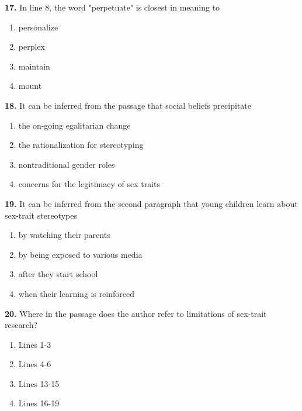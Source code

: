 \documentclass[12pt]{article}
\begin{document}
\par
\vspace{0.25\baselineskip}
\noindent\textbf{17.} In line 8, the word "perpetuate" is closest in meaning to
\begin{enumerate}[label=(\Alph*),leftmargin=*,itemsep=0.2em]
\item personalize
\item perplex
\item maintain
\item mount
\end{enumerate}
\par
\vspace{0.25\baselineskip}
\noindent\textbf{18.} It can be inferred from the passage that social beliefs precipitate
\begin{enumerate}[label=(\Alph*),leftmargin=*,itemsep=0.2em]
\item the on-going egalitarian change
\item the rationalization for stereotyping
\item nontraditional gender roles
\item concerns for the legitimacy of sex traits
\end{enumerate}
\par
\vspace{0.25\baselineskip}
\noindent\textbf{19.} It can be inferred from the second paragraph that young children learn about sex-trait stereotypes
\begin{enumerate}[label=(\Alph*),leftmargin=*,itemsep=0.2em]
\item by watching their parents
\item by being exposed to various media
\item after they start school
\item when their learning is reinforced
\end{enumerate}
\par
\vspace{0.25\baselineskip}
\noindent\textbf{20.} Where in the passage does the author refer to limitations of sex-trait research?
\begin{enumerate}[label=(\Alph*),leftmargin=*,itemsep=0.2em]
\item Lines 1-3
\item Lines 4-6
\item Lines 13-15
\item Lines 16-19
\end{enumerate}
\par
\vspace{0.25\baselineskip}
\end{document}
